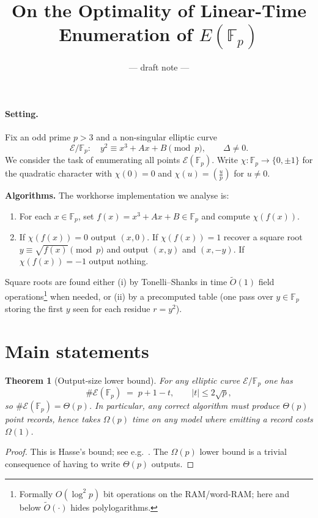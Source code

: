 \documentclass[11pt]{article}
\title{On the Optimality of Linear-Time Enumeration of $E(\mathbb{F}_p)$}
\author{--- draft note ---}
\date{}
\newtheorem{theorem}{Theorem}
\newcommand{\Fp}{\mathbb{F}_p}
\newcommand{\E}{\mathcal{E}}
\newcommand{\leg}[2]{\left(\frac{#1}{#2}\right)}
\begin{document}
\maketitle

\paragraph{Setting.}
Fix an odd prime $p>3$ and a non-singular elliptic curve
\[
  \E/\Fp:\quad y^2 \equiv x^3 + A x + B \pmod p,\qquad \Delta\neq 0.
\]
We consider the task of enumerating all points $\E(\Fp)$.
Write $\chi:\Fp\to\{0,\pm1\}$ for the quadratic character with $\chi(0)=0$ and $\chi(u)=\leg{u}{p}$ for $u\neq 0$.

\medskip
\noindent
\textbf{Algorithms.} The workhorse implementation we analyse is:
\begin{enumerate}
  \item For each $x\in\Fp$, set $f(x)=x^3+Ax+B\in\Fp$ and compute $\chi(f(x))$.
  \item If $\chi(f(x))=0$ output $(x,0)$. If $\chi(f(x))=1$ recover a square root $y\equiv\sqrt{f(x)}\pmod p$ and output $(x,y)$ and $(x,-y)$. If $\chi(f(x))=-1$ output nothing.
\end{enumerate}
Square roots are found either (i) by Tonelli–Shanks in time $\tilde O(1)$ field operations\footnote{Formally $O(\log^2 p)$ bit operations on the RAM/word-RAM; here and below $\tilde O(\cdot)$ hides polylogarithms.} when needed, or (ii) by a precomputed table (one pass over $y\in\Fp$ storing the first $y$ seen for each residue $r=y^2$).

\section*{Main statements}

\begin{theorem}[Output-size lower bound]\label{thm:hasse}
For any elliptic curve $\E/\Fp$ one has
\[
  \#\E(\Fp) \;=\; p+1 - t,\qquad |t|\le 2\sqrt{p},
\]
so $\#\E(\Fp)=\Theta(p)$. In particular, any correct algorithm must \emph{produce} $\Theta(p)$ point records, hence takes $\Omega(p)$ time on any model where emitting a record costs $\Omega(1)$. 
\end{theorem}

\begin{proof}
This is Hasse's bound; see e.g.\ \cite[Thm.~V.1.1]{SilvermanTate}. The $\Omega(p)$ lower bound is a trivial consequence of having to write $\Theta(p)$ outputs.
\end{proof}
\end{document}
